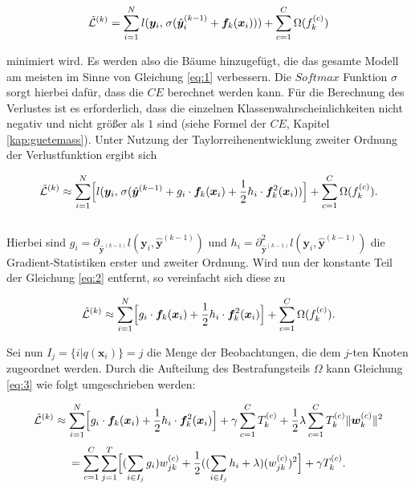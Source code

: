 \documentclass[a4paper,11pt]{article}
\begin{document}
\[\Tilde{\mathcal{L}}^{(k)} = \sum_{i = 1}^N l(\bm{y}_i,\hspace{0.04cm} \sigma (\hat{\bm{y}}_i^{(k-1)} + \bm{f}_k(\bm{x}_i))) + \sum_{c=1}^C \Omega(f_k^{(c)}) \]

minimiert wird. Es werden also die Bäume hinzugefügt, die das gesamte Modell am meisten im Sinne von Gleichung \ref{eq:1} verbessern. Die $Softmax$ Funktion $\sigma$ sorgt hierbei dafür, dass die $CE$ berechnet werden kann. Für die Berechnung des Verlustes ist es erforderlich, dass die einzelnen Klassenwahrscheinlichkeiten nicht negativ und nicht größer als $1$ sind (siehe Formel der $CE$, Kapitel \ref{kap:guetemass}). Unter Nutzung der Taylorreihenentwicklung zweiter Ordnung der Verlustfunktion ergibt sich 

\begin{equation}\label{eq:2}
     \Tilde{\mathcal{L}}^{(k)} \approx \sum_{i = 1}^N \Bigl[ l(\bm{y}_i,\hspace{0.04cm} \sigma(\hat{\bm{y}}^{(k-1)} + g_i \cdot \bm{f}_k(\bm{x}_i) + \frac{1}{2}h_i \cdot \bm{f}_k^2(\bm{x}_i)) \Bigr] + \sum_{c=1}^C \Omega(f_k^{(c)}). 
\end{equation}{}\\

Hierbei sind $g_i = \partial_{\hat{\bm{y}}^{(k-1)}} l(\bm{y}_i, \hat{\bm{y}}^{(k-1)})$  und $h_i = \partial_{\hat{\bm{y}}^{(k-1)}}^2 l(\bm{y}_i, \hat{\bm{y}}^{(k-1)})$ die Gradient-Statistiken erster und zweiter Ordnung. Wird nun der konstante Teil der Gleichung \ref{eq:2} entfernt, so vereinfacht sich diese zu

\begin{equation}\label{eq:3}
     \Tilde{\mathcal{L}}^{(k)} \approx \sum_{i = 1}^N \Bigl[g_i \cdot \bm{f}_k(\bm{x}_i) + \frac{1}{2}h_i \cdot \bm{f}_k^2(\bm{x}_i) \Bigr] + \sum_{c=1}^C \Omega(f_k^{(c)}). 
\end{equation}{}

Sei nun $I_j = \{i|q(\bm{x}_i)\} = j$ die Menge der Beobachtungen, die dem $j$-ten Knoten zugeordnet werden. Durch die Aufteilung des Bestrafungsteils $\Omega$ kann Gleichung \ref{eq:3} wie folgt umgeschrieben werden:

\begin{equation}\label{eq:4}
     \Tilde{\mathcal{L}}^{(k)} \approx \sum_{i = 1}^N \Bigl[g_i \cdot \bm{f}_k(\bm{x}_i) + \frac{1}{2}h_i \cdot \bm{f}_k^2(\bm{x}_i) \Bigr] + \gamma \sum_{c=1}^C T_k^{(c)} + \frac{1}{2} \lambda \sum_{c=1}^C T_k^{(c)} \|\bm{w}_k^{(c)}\|^2 
\end{equation}{}
\begin{equation*}
     =\sum_{c=1}^C  \sum_{j = 1}^T \Bigl[(\sum_{i \in I_j}g_i) w_{jk}^{(c)} + \frac{1}{2}((\sum_{i \in I_j} h_i + \lambda) (w_{jk}^{(c)})^2 \Bigr] + \gamma T_k^{(c)}.
\end{equation*}{}
\end{document}
